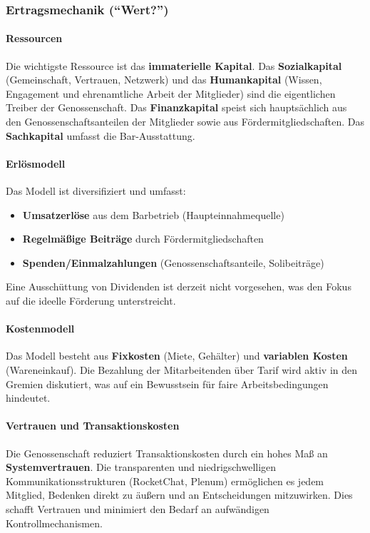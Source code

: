 \subsubsection{Ertragsmechanik (\enquote{Wert?})}

\paragraph{Ressourcen}
Die wichtigste Ressource ist das \textbf{immaterielle Kapital}. Das \textbf{Sozialkapital} (Gemeinschaft, Vertrauen, Netzwerk) und das \textbf{Humankapital} (Wissen, Engagement und ehrenamtliche Arbeit der Mitglieder) sind die eigentlichen Treiber der Genossenschaft. Das \textbf{Finanzkapital} speist sich hauptsächlich aus den Genossenschaftsanteilen der Mitglieder sowie aus Fördermitgliedschaften. Das \textbf{Sachkapital} umfasst die Bar-Ausstattung.

\paragraph{Erlösmodell}
Das Modell ist diversifiziert und umfasst:
\begin{itemize}
\item \textbf{Umsatzerlöse} aus dem Barbetrieb (Haupteinnahmequelle)
\item \textbf{Regelmäßige Beiträge} durch Fördermitgliedschaften
\item \textbf{Spenden/Einmalzahlungen} (Genossenschaftsanteile, Solibeiträge)
\end{itemize}

Eine Ausschüttung von Dividenden ist derzeit nicht vorgesehen, was den Fokus auf die ideelle Förderung unterstreicht.

\paragraph{Kostenmodell}
Das Modell besteht aus \textbf{Fixkosten} (Miete, Gehälter) und \textbf{variablen Kosten} (Wareneinkauf). Die Bezahlung der Mitarbeitenden über Tarif wird aktiv in den Gremien diskutiert, was auf ein Bewusstsein für faire Arbeitsbedingungen hindeutet.

\paragraph{Vertrauen und Transaktionskosten}
Die Genossenschaft reduziert Transaktionskosten durch ein hohes Maß an \textbf{Systemvertrauen}. Die transparenten und niedrigschwelligen Kommunikationsstrukturen (RocketChat, Plenum) ermöglichen es jedem Mitglied, Bedenken direkt zu äußern und an Entscheidungen mitzuwirken. Dies schafft Vertrauen und minimiert den Bedarf an aufwändigen Kontrollmechanismen.

